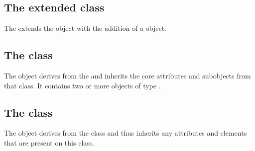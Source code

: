 
\subsection{The extended  class}
\label{extended-model-class}




The \FooPackage extends the  object with the addition of
a \ListOfApples object.

\subsection{The  class}
\label{listofapples-class}


The \ListOfApples object derives from the  and inherits the
core attributes and subobjects from that class. It contains two or more
objects of type \Apple.

\subsection{The  class}
\label{apple-class}




The \Apple object derives from the \SBase class and thus inherits any
attributes and elements that are present on this class.
